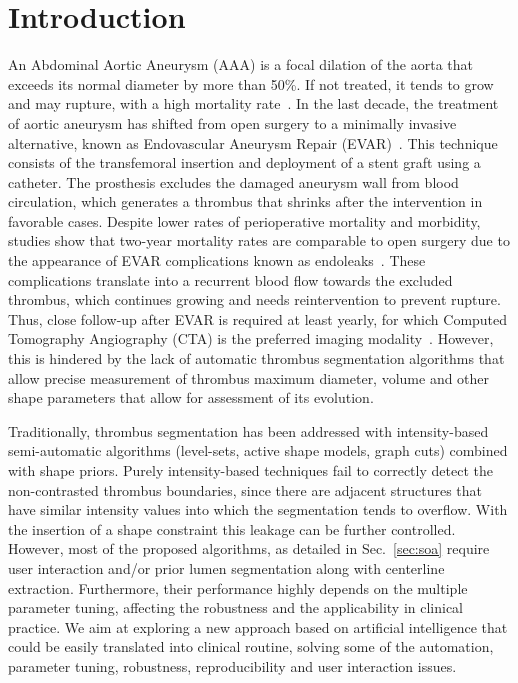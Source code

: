 \documentclass[preprint,authoryear,12pt]{elsarticle}
\begin{document}

\section{Introduction}

An Abdominal Aortic Aneurysm (AAA) is a focal dilation of the aorta that exceeds its normal diameter by more than 50\%. If not treated, it tends to grow and may rupture, with a high mortality rate~\citep{Pear08}. In the last decade, the treatment of aortic aneurysm has shifted from open surgery to a minimally invasive alternative, known as Endovascular Aneurysm Repair (EVAR)~\citep{Mol11}. This technique consists of the transfemoral insertion and deployment of a stent graft using a catheter. The prosthesis excludes the damaged aneurysm wall from blood circulation, which generates a thrombus that shrinks after the intervention in favorable cases. Despite lower rates of perioperative mortality and morbidity, studies show that two-year mortality rates are comparable to open surgery due to the appearance of EVAR complications known as endoleaks~\citep{Sta13}. These complications translate into a recurrent blood flow towards the excluded thrombus, which continues growing and needs reintervention to prevent rupture. Thus, close follow-up after EVAR is required at least yearly, for which Computed Tomography Angiography (CTA) is the preferred imaging modality~\citep{wal10}. However, this is hindered by the lack of automatic thrombus segmentation algorithms that allow precise measurement of thrombus maximum diameter, volume and other shape parameters that allow for assessment of its evolution.

Traditionally, thrombus segmentation has been addressed with intensity-based semi-automatic algorithms (level-sets, active shape models, graph cuts) combined with shape priors. Purely intensity-based techniques fail to correctly detect the non-contrasted thrombus boundaries, since there are adjacent structures that have similar intensity values into which the segmentation tends to overflow. With the insertion of a shape constraint this leakage can be further controlled. However, most of the proposed algorithms, as detailed in Sec.~\ref{sec:soa} require user interaction and/or prior lumen segmentation along with centerline extraction. Furthermore, their performance highly depends on the multiple parameter tuning, affecting the robustness and the applicability in clinical practice. We aim at exploring a new approach based on artificial intelligence that could be easily translated into clinical routine, solving some of the automation, parameter tuning, robustness, reproducibility and user interaction issues. \par
\end{document}
